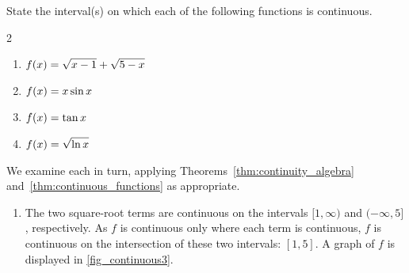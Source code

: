 \begin{example}\label{ex_cont_funct}%
State the interval(s) on which each of the following functions is continuous.
\begin{multicols}{2}
	\begin{enumerate}
		\item	$\displaystyle f(x) = \sqrt{x-1} + \sqrt{5-x}$
		\item	$\displaystyle f(x) = x\sin x$
		\item	$\displaystyle f(x) = \tan x$
		\item	$\displaystyle f(x) = \sqrt{\ln x}$
	\end{enumerate}
\end{multicols}
\solution
We examine each in turn, applying Theorems~\ref{thm:continuity_algebra} and~\ref{thm:continuous_functions} as appropriate.


\begin{enumerate}
	\item	The two square-root terms are continuous on the intervals $[1,\infty)$ and $(-\infty,5]$, respectively. As $f$ is continuous only where each term is continuous, $f$ is continuous on the intersection of these two intervals: $[1,5]$. A graph of $f$ is displayed in \autoref{fig_continuous3}.


\end{enumerate}
\end{example}
